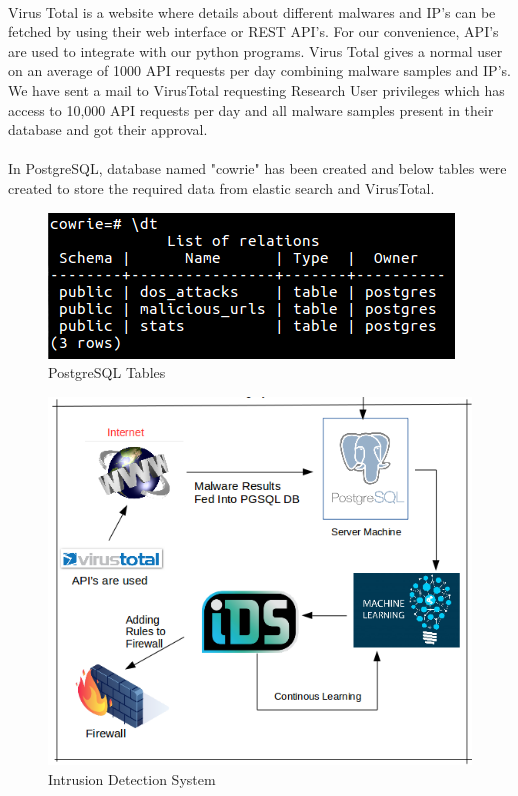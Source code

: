 \documentclass{article}
\begin{document}
\paragraph{}
Virus Total is a website where details about different malwares and IP's can be fetched by using their web interface or REST API's. For our convenience, API's are used to integrate with our python programs. Virus Total gives a normal user on an average of 1000 API requests per day combining malware samples and IP's. We have sent a mail to VirusTotal requesting Research User  privileges which has access to 10,000 API requests per day and all malware samples present in their database and got their approval.

\paragraph{}
In PostgreSQL, database named "cowrie" has been created and below tables were created to store the required data from elastic search and VirusTotal.

\begin{figure}[H]
\centering
\caption{PostgreSQL Tables}
\includegraphics[scale=0.7]{Tables}
\end{figure}

\begin{figure}[H]
\centering
\caption{Intrusion Detection System}
\includegraphics[scale=0.7]{Intrusion_Detection_System}
\end{figure}
\end{document}
